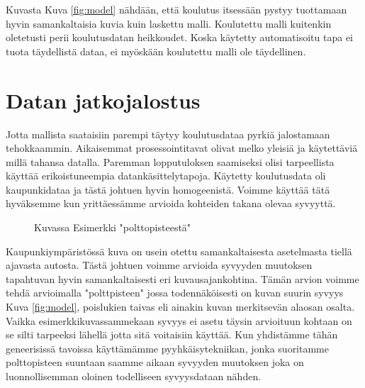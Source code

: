 Kuvasta Kuva \ref{fig:model} nähdään, että koulutus itsessään pystyy tuottamaan hyvin samankaltaisia kuvia kuin laskettu malli. Koulutettu malli kuitenkin oletetusti perii koulutusdatan heikkoudet. Koska käytetty automatisoitu tapa ei tuota täydellistä dataa, ei myöskään koulutettu malli ole täydellinen. 


\section{Datan jatkojalostus}

Jotta mallista saataisiin parempi täytyy koulutusdataa pyrkiä jalostamaan tehokkaammin. 
Aikaisemmat prosessointitavat olivat melko yleisiä ja käytettäviä millä tahansa datalla.
Paremman lopputuloksen saamiseksi olisi tarpeellista käyttää erikoistuneempia datankäsittelytapoja.
Käytetty koulutusdata oli kaupunkidataa ja tästä johtuen hyvin homogeenistä.
Voimme käyttää tätä hyväksemme kun yrittäessämme arvioida kohteiden takana olevaa syvyyttä.

\begin{figure}[h]
\centering
{}
\caption{Kuvassa Esimerkki "polttopisteestä"}
\label{fig:polttopiste}
\end{figure}


Kaupunkiympäristössä kuva on usein otettu samankaltaisesta asetelmasta tiellä ajavasta autosta. 
Tästä johtuen voimme arvioida syvyyden muutoksen tapahtuvan hyvin samankaltaisesti eri kuvausajankohtina.
Tämän arvion voimme tehdä arvioimalla "polttpisteen" jossa todennäköisesti on kuvan suurin syvyys Kuva \ref{fig:model},
poislukien taivas eli ainakin kuvan merkitsevän alaosan osalta. Vaikka esimerkkikuvassammekaan syvyys ei asetu täysin arvioituun kohtaan
on se silti tarpeeksi lähellä jotta sitä voitaisiin käyttää. 
Kun yhdistämme tähän geneerisissä tavoissa käyttämämme pyyhkäisytekniikan, jonka suoritamme polttopisteen suuntaan 
saamme aikaan syvyyden muutoksen joka on luonnollisemman oloinen todelliseen syvyysdataan nähden.

